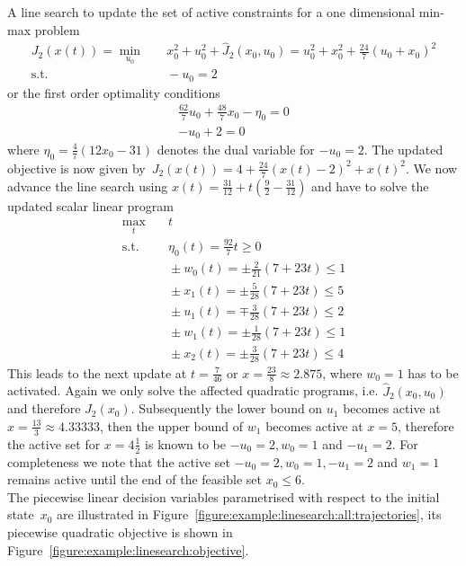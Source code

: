 \begin{example}{A line search to update the set of active constraints for a one dimensional min-max problem}
%
$$
\begin{aligned}
J_2(x(t)) = \min_{u_0}&\quad x_0^2+u_0^2+\hat J_2(x_0,u_0) = u_0^2 + x_0^2 + \frac{24}{7} (u_0 + x_0)^2\\
\text{s.t.}&\quad -u_0 = 2
\end{aligned}
$$
%
or the first order optimality conditions
%
$$
\begin{aligned}
\frac{62}{7}u_0 + \frac{48}{7}x_0 - \eta_0 = 0\\
-u_0 + 2=0
\end{aligned}
$$
where $\eta_0 = \frac{4}{7} (12 x_0-31)$ denotes the dual variable for $-u_0=2$.
%
The updated objective is now given by~$J_2(x(t)) = 4 + \frac{24}{7} (x(t)-2)^2 + x(t)^2$. 
%
We now advance the line search using $x(t) = \frac{31}{12} + t(\frac{9}{2}-\frac{31}{12})$ and have to solve the updated scalar linear program 
%
$$\begin{aligned}
\max_t&\quad t\\
\text{s.t.}&\quad \eta_0(t) = \frac{92}{7}t \geq 0\\
&\quad \pm w_0(t) = \pm\frac{2}{21} (7 + 23 t) \leq 1\\
&\quad \pm x_1(t) = \pm\frac{5}{28} (7 + 23 t)\leq 5 \\
&\quad \pm u_1(t) = \mp\frac{3}{28} (7 + 23 t) \leq 2\\
&\quad \pm w_1(t) = \pm \frac{1}{28} (7 + 23 t)\leq 1\\
&\quad \pm x_2(t) = \pm \frac{3}{28} (7 + 23 t)\leq 4
\end{aligned}$$
%
This leads to the next update at $t=\frac{7}{46}$ or $x = \frac{23}{8}\approx2.875$, where $w_0=1$ has to be activated.
%
Again we only solve the affected quadratic programs, i.e. $\hat J_2(x_0,u_0)$ and therefore $J_2(x_0)$.
%
Subsequently the lower bound on $u_1$ becomes active at $x = \frac{13}{3}\approx4.33333$, then the upper bound of $w_1$ becomes active at $x=5$, therefore the active set for $x=4\frac{1}{2}$ is known to be $-u_0=2,w_0=1$ and $-u_1 = 2$.
%
For completeness we note that the active set $-u_0=2,w_0=1,-u_1=2$ and $w_1=1$ remains active until the end of the feasible set $x_0\leq6$.
\\[1em]
The piecewise linear decision variables parametrised with respect to the initial state~$x_0$ are illustrated in Figure~\ref{figure:example:linesearch:all:trajectories}, its piecewise quadratic objective is shown in Figure~\ref{figure:example:linesearch:objective}.
%
%
%
%
%
%
\begin{figure}\centering
\begin{tikzpicture}

\end{tikzpicture}
\end{figure}
\end{example}
